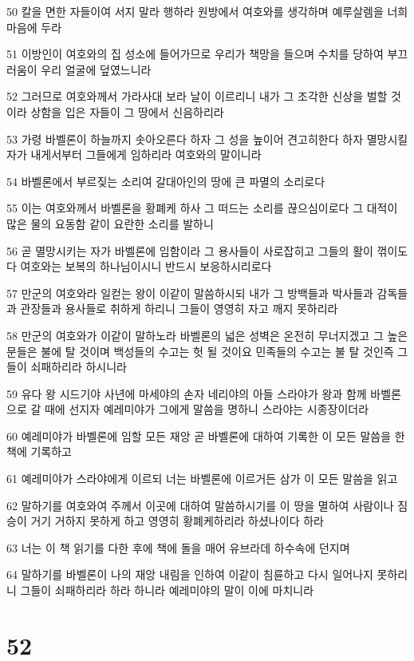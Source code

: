\par 50 칼을 면한 자들이여 서지 말라 행하라 원방에서 여호와를 생각하며 예루살렘을 너희 마음에 두라
\par 51 이방인이 여호와의 집 성소에 들어가므로 우리가 책망을 들으며 수치를 당하여 부끄러움이 우리 얼굴에 덮였느니라
\par 52 그러므로 여호와께서 가라사대 보라 날이 이르리니 내가 그 조각한 신상을 벌할 것이라 상함을 입은 자들이 그 땅에서 신음하리라
\par 53 가령 바벨론이 하늘까지 솟아오른다 하자 그 성을 높이어 견고히한다 하자 멸망시킬 자가 내게서부터 그들에게 임하리라 여호와의 말이니라
\par 54 바벨론에서 부르짖는 소리여 갈대아인의 땅에 큰 파멸의 소리로다
\par 55 이는 여호와께서 바벨론을 황폐케 하사 그 떠드는 소리를 끊으심이로다 그 대적이 많은 물의 요동함 같이 요란한 소리를 발하니
\par 56 곧 멸망시키는 자가 바벨론에 임함이라 그 용사들이 사로잡히고 그들의 활이 꺾이도다 여호와는 보복의 하나님이시니 반드시 보응하시리로다
\par 57 만군의 여호와라 일컫는 왕이 이같이 말씀하시되 내가 그 방백들과 박사들과 감독들과 관장들과 용사들로 취하게 하리니 그들이 영영히 자고 깨지 못하리라
\par 58 만군의 여호와가 이같이 말하노라 바벨론의 넓은 성벽은 온전히 무너지겠고 그 높은 문들은 불에 탈 것이며 백성들의 수고는 헛 될 것이요 민족들의 수고는 불 탈 것인즉 그들이 쇠패하리라 하시니라
\par 59 유다 왕 시드기야 사년에 마세야의 손자 네리야의 아들 스라야가 왕과 함께 바벨론으로 갈 때에 선지자 예레미야가 그에게 말씀을 명하니 스라야는 시종장이더라
\par 60 예레미야가 바벨론에 임할 모든 재앙 곧 바벨론에 대하여 기록한 이 모든 말씀을 한 책에 기록하고
\par 61 예레미야가 스라야에게 이르되 너는 바벨론에 이르거든 삼가 이 모든 말씀을 읽고
\par 62 말하기를 여호와여 주께서 이곳에 대하여 말씀하시기를 이 땅을 멸하여 사람이나 짐승이 거기 거하지 못하게 하고 영영히 황폐케하리라 하셨나이다 하라
\par 63 너는 이 책 읽기를 다한 후에 책에 돌을 매어 유브라데 하수속에 던지며
\par 64 말하기를 바벨론이 나의 재앙 내림을 인하여 이같이 침륜하고 다시 일어나지 못하리니 그들이 쇠패하리라 하라 하니라 예레미야의 말이 이에 마치니라

\chapter{52}

